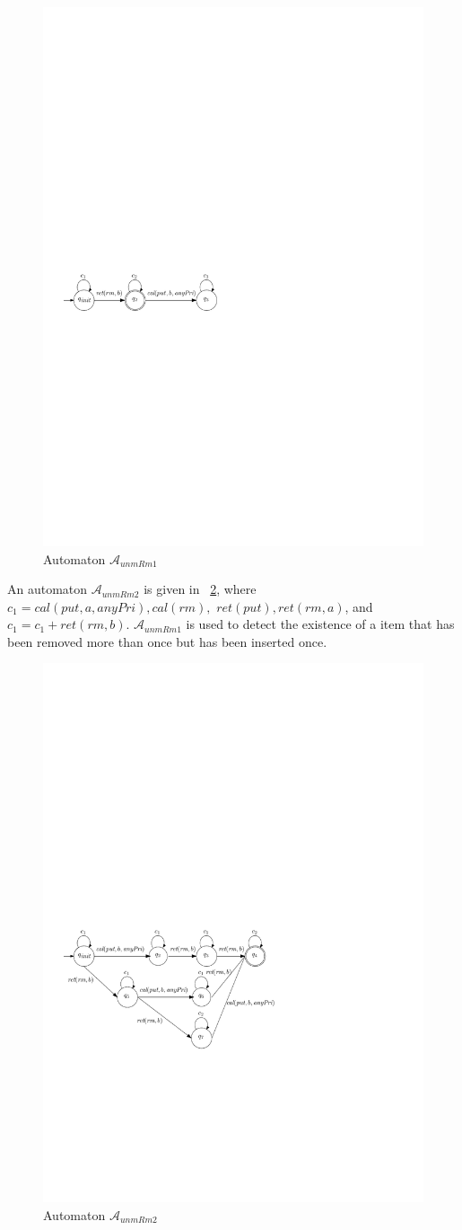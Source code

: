 \begin{figure}[htbp]
  \centering
  \includegraphics[width=0.5 \textwidth]{PIC_AUTO_UNMATCHED_RM1.pdf}
  \caption{Automaton $\mathcal{A}_{\textit{unmRm1}}$}
  \label{fig:automata for unmatched rm1}
\end{figure}

An automaton $\mathcal{A}_{\textit{unmRm2}}$ is given in \figurename~\ref{fig:automata for unmatched rm2}, where $c_1 = \textit{cal}(\textit{put},a,\textit{anyPri}),\textit{cal}(rm),$ $\textit{ret}(\textit{put}),\textit{ret}(\textit{rm},a)$, and $c_1 = c_1 + \textit{ret}(\textit{rm},b)$.  $\mathcal{A}_{\textit{unmRm1}}$ is used to detect the existence of a item that has been removed more than once but has been inserted once.

\begin{figure}[htbp]
  \centering
  \includegraphics[width=0.5 \textwidth]{PIC_AUTO_UNMATCHED_RM2.pdf}
  \caption{Automaton $\mathcal{A}_{\textit{unmRm2}}$}
  \label{fig:automata for unmatched rm2}
\end{figure}



